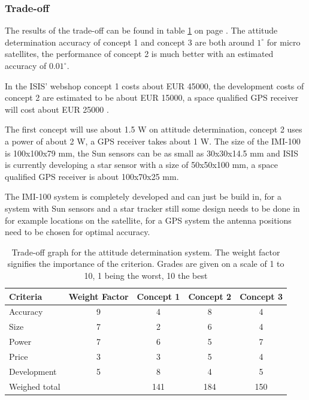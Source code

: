 \subsubsection{Trade-off}
The results of the trade-off can be found in table \ref{tab:adstradeoff} on page \pageref{tab:adstradeoff}. 
The attitude determination accuracy of concept 1 and concept 3 are both around $1^\circ$ for micro satellites, the performance of concept 2 is much better with an estimated accuracy of $0.01^\circ$.

In the \ac{ISIS}' webshop \cite{cubesatshop} concept 1 costs about EUR 45000, the development costs of concept 2 are estimated to be about EUR 15000, a space qualified \ac{GPS} receiver will cost about EUR 25000 \cite{spacequest}.

The first concept will use about 1.5 W on attitude determination, concept 2 uses a power of about 2 W, a \ac{GPS} receiver takes about 1 W.
The size of the IMI-100 is 100x100x79 mm, the Sun sensors can be as small as 30x30x14.5 mm \cite{tnoweb} and \ac{ISIS} is currently developing a star sensor with a size of 50x50x100 mm, a space qualified \ac{GPS} receiver is about 100x70x25 mm. 

The IMI-100 system is completely developed and can just be build in, for a system with Sun sensors and a star tracker still some design needs to be done in for example locations on the satellite, for a \ac{GPS} system the antenna positions need to be chosen for optimal accuracy.

\begin{table} [h]
\centering
\begin{tabular}{p{3cm} | c | c c c}
\textbf{Criteria} & \textbf{Weight Factor} & \textbf{Concept 1} & \textbf{Concept 2} & \textbf{Concept 3} \\ \hline \hline
Accuracy    & 9 & 4 & 8 & 4\\
Size        & 7 & 2 & 6 & 4\\
Power       & 7 & 6 & 5 & 7\\
Price       & 3 & 3 & 5 & 4\\
Development & 5 & 8 & 4 & 5\\ \hline
Weighed total    &    & 141 & 184 & 150
\end{tabular} 
\caption[Trade-off attitude determination]{Trade-off graph for the attitude determination system. The weight factor signifies the importance of the criterion. Grades are given on a scale of 1 to 10, 1 being the worst, 10 the best}
\label{tab:adstradeoff}
\end{table}

